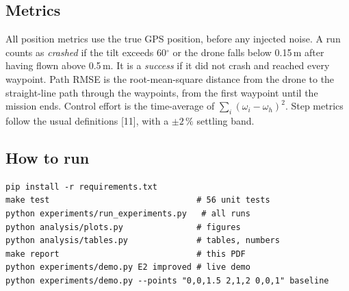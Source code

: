\subsection{Metrics}
All position metrics use the true GPS position, before any injected noise. A run counts as \emph{crashed} if the tilt exceeds 60$^\circ$ or the drone falls below 0.15\,m after having flown above 0.5\,m. It is a \emph{success} if it did not crash and reached every waypoint. Path RMSE is the root-mean-square distance from the drone to the straight-line path through the waypoints, from the first waypoint until the mission ends. Control effort is the time-average of $\sum_i(\omega_i - \omega_h)^2$. Step metrics follow the usual definitions [11], with a $\pm2\,\%$ settling band.

\subsection{How to run}
\begin{verbatim}
pip install -r requirements.txt
make test                              # 56 unit tests
python experiments/run_experiments.py   # all runs
python analysis/plots.py               # figures
python analysis/tables.py              # tables, numbers
make report                            # this PDF
python experiments/demo.py E2 improved # live demo
python experiments/demo.py --points "0,0,1.5 2,1,2 0,0,1" baseline
\end{verbatim}
